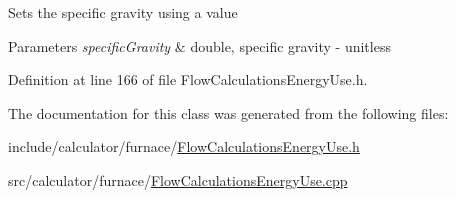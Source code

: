 Sets the specific gravity using a value


\begin{DoxyParams}{Parameters}
{\em specific\+Gravity} & double, specific gravity -\/ unitless \\
\hline
\end{DoxyParams}


Definition at line 166 of file Flow\+Calculations\+Energy\+Use.\+h.



The documentation for this class was generated from the following files\+:\begin{DoxyCompactItemize}
\item 
include/calculator/furnace/\hyperlink{_flow_calculations_energy_use_8h}{Flow\+Calculations\+Energy\+Use.\+h}\item 
src/calculator/furnace/\hyperlink{_flow_calculations_energy_use_8cpp}{Flow\+Calculations\+Energy\+Use.\+cpp}\end{DoxyCompactItemize}
